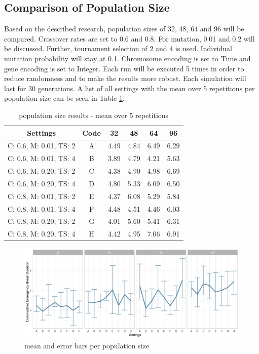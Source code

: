 \subsection{Comparison of Population Size}
Based on the described research, population sizes of 32, 48, 64 and 96 will be compared. Crossover rates are set to 0.6 and 0.8. For mutation, 0.01 and 0.2 will be discussed. Further, tournament selection of 2 and 4 is used. Individual mutation probability will stay at 0.1. Chromosome encoding is set to Time and gene encoding is set to Integer.  Each run will be executed 5 times in order to reduce randomness and to make the results more robust. Each simulation will last for 30 generations. A list of all settings with the mean over 5 repetitions per population size can be seen in Table \ref{tab:hyperparameter_tuning:pop_settings_results}.

\begin{table}[ht]
	\centering
	\begin{tabular}{ c|c|cccc  }
		\hline
		Settings & Code & 32 & 48 & 64 & 96\\
		\hline
		C: 0.6, M: 0.01, TS: 2   	& A & 4.49 & 4.84 & 6.49 & 6.29 \\
		C: 0.6, M: 0.01, TS: 4		& B & 3.89 & 4.79 & 4.21 & 5.63 \\ 
		C: 0.6, M: 0.20, TS: 2 		& C & 4.38 & 4.90 & 4.98 & 6.69 \\
		C: 0.6, M: 0.20, TS: 4    	& D & 4.80 & 5.33 & 6.09 & 6.50 \\
		C: 0.8, M: 0.01, TS: 2   	& E & 4.37 & 6.08 & 5.29 & 5.84 \\
		C: 0.8, M: 0.01, TS: 4		& F & 4.48 & 4.51 & 4.46 & 6.03 \\
		C: 0.8, M: 0.20, TS: 2 		& G & 4.01 & 5.60 & 5.41 & 6.31 \\
		C: 0.8, M: 0.20, TS: 4    	& H & 4.42 & 4.95 & 7.06 & 6.91 \\
		\hline
	\end{tabular}
	\caption{population size results - mean over 5 repetitions}
	\label{tab:hyperparameter_tuning:pop_settings_results}
\end{table}

\begin{figure}[ht] 
	\includegraphics[width=1\linewidth]{simulations/population/plots/comparison}
	\caption{mean and error bars per population size}
	\label{fig:hyperparameter_tuning:population_results}
\end{figure}

